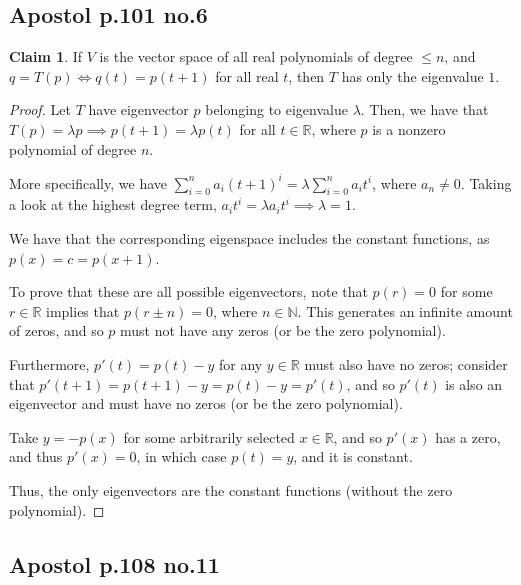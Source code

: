 \documentclass[12pt,letterpaper]{article}
\theoremstyle{definition}
\newtheorem*{claim}{Claim}
\newcommand{\R}{\mathbb{R}}
\newcommand{\N}{\mathbb{N}}
\begin{document}
\subsection*{Apostol p.101 no.6}

\begin{claim}
  If $V$ is the vector space of all real polynomials of degree $\leq n$, and $q
  = T(p) \iff q(t) = p(t + 1)$ for all real $t$, then $T$ has only the
  eigenvalue $1$.
\end{claim}

\begin{proof}
  Let $T$ have eigenvector $p$ belonging to eigenvalue $\lambda$. Then, we have
  that $T(p) = \lambda p \implies p(t + 1) = \lambda p(t)$ for all $t \in \R$,
  where $p$ is a nonzero polynomial of degree $n$.

  More specifically, we have $\sum_{i=0}^na_i(t+1)^i =
  \lambda\sum_{i=0}^na_it^i$, where $a_n \neq 0$. Taking a look at the highest
  degree term, $a_it^i = \lambda a_it^i \implies \lambda = 1$.

  We have that the corresponding eigenspace includes the constant functions, as
  $p(x) = c = p(x + 1)$.

  To prove that these are all possible eigenvectors, note that $p(r) = 0$ for
  some $r \in \R$ implies that $p(r \pm n) = 0$, where $n \in \N$. This
  generates an infinite amount of zeros, and so $p$ must not have any zeros (or
  be the zero polynomial).

  Furthermore, $p'(t) = p(t) - y$ for any $y \in \R$ must also have no zeros;
  consider that $p'(t + 1) = p(t + 1) - y = p(t) - y = p'(t)$, and so $p'(t)$ is
  also an eigenvector and must have no zeros (or be the zero polynomial).

  Take $y = -p(x)$ for some arbitrarily selected $x \in \R$, and so $p'(x)$ has a
  zero, and thus $p'(x) = 0$, in which case $p(t) = y$, and it is
  constant.

  Thus, the only eigenvectors are the constant functions (without the zero polynomial).


\end{proof}

\subsection*{Apostol p.108 no.11}
\end{document}
